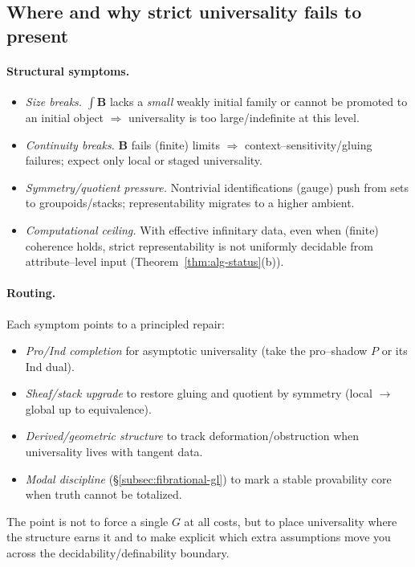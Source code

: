 \documentclass[11pt]{article}
\theoremstyle{upright}
\begin{document}
\subsection{Where and why strict universality fails to present}\label{subsec:diagnostics}
\paragraph{Structural symptoms.}
\begin{itemize}[nosep,leftmargin=2em]
\item \emph{Size breaks.} $\int\!\mathbf B$ lacks a \emph{small} weakly initial family or cannot be promoted to an initial object $\Rightarrow$ universality is too large/indefinite at this level.
\item \emph{Continuity breaks.} $\mathbf B$ fails (finite) limits $\Rightarrow$ context–sensitivity/gluing failures; expect only local or staged universality.
\item \emph{Symmetry/quotient pressure.} Nontrivial identifications (gauge) push from sets to groupoids/stacks; representability migrates to a higher ambient.
\item \emph{Computational ceiling.} With effective infinitary data, even when (finite) coherence holds, strict representability is not uniformly decidable from attribute–level input (Theorem~\ref{thm:alg-status}(b)).
\end{itemize}

\paragraph{Routing.}
Each symptom points to a principled repair:
\begin{itemize}[leftmargin=2em]
\item \emph{Pro/Ind completion} for asymptotic universality (take the pro–shadow $P$ or its Ind dual).
\item \emph{Sheaf/stack upgrade} to restore gluing and quotient by symmetry (local $\to$ global up to equivalence).
\item \emph{Derived/geometric structure} to track deformation/obstruction when universality lives with tangent data.
\item \emph{Modal discipline} (\S\ref{subsec:fibrational-gl}) to mark a stable provability core when truth cannot be totalized.
\end{itemize}
The point is not to force a single $G$ at all costs, but to place universality where the structure earns it and to make explicit which extra assumptions move you across the decidability/definability boundary.
\end{document}
